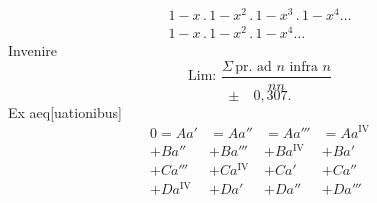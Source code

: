 \[\begin{gathered}
1-x\mathpunct{.}1-x^2\mathpunct{.}1-x^3\mathpunct{.}1-x^4\ldots\\
1-x\mathpunct{.}1-x^2\mathpunct{.}1-x^4\ldots
\end{gathered}\]
\ClosingRule
{}
\noindent\hspace*{\parindent}Invenire
\[\text{Lim: }\frac{\Sigma\,\text{pr. ad }n\text{ infra }n}{nn}\]
\[\pm\quad0{,}307.\]
\ClosingRule
{}
\noindent\hspace*{\parindent}Ex aeq[uationibus]
\[\begin{array}{r|r|r|r}
0=Aa'&=Aa''&=Aa'''&=Aa^{\mathrm{IV}}\\
+Ba''&+Ba'''&+Ba^{\mathrm{IV}}&+Ba'\\
+Ca'''&+Ca^{\mathrm{IV}}&+Ca'&+Ca''\\
+Da^{\mathrm{IV}}&+Da'&+Da''&+Da'''
\end{array}\]
\clearpage
